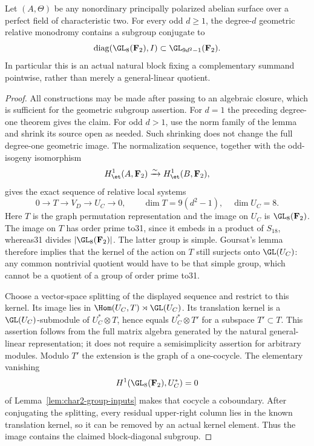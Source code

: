 \begin{theorem}
\label{thm:nonordinary-ppav-odd-natural-block-candidate}
Let $(A,\Theta)$ be any nonordinary principally polarized abelian
surface over a perfect field of characteristic two. For every odd
$d\ge1$, the degree-$d$ geometric relative monodromy contains a
subgroup conjugate to
\[
                      \operatorname{diag}(\GL_8(\mathbf F_2),I)
                  \subset\GL_{9d^2-1}(\mathbf F_2).
\]
In particular this is an actual natural block fixing a complementary
summand pointwise, rather than merely a general-linear quotient.
\end{theorem}
\begin{proof}
All constructions may be made after passing to an algebraic closure,
which is sufficient for the geometric subgroup assertion. For $d=1$
the preceding degree-one theorem gives the claim. For odd $d>1$,
use the norm family of the lemma and shrink its source open as needed.
Such shrinking does not change the full degree-one geometric image.
The normalization sequence, together with the odd-isogeny isomorphism
\[
             H^1_{\et}(A,\mathbf F_2)
                      \xrightarrow{\sim}H^1_{\et}(B,\mathbf F_2),
\]
gives the exact sequence of relative local systems
\[
 0\longrightarrow T\longrightarrow V_D\longrightarrow U_C
       \longrightarrow0,\qquad
 \dim T=9(d^2-1),\quad \dim U_C=8.
\]
Here $T$ is the graph permutation representation and the image on
$U_C$ is $\GL_8(\mathbf F_2)$. The image on $T$ has order prime to31,
since it embeds in a product of $S_{18}$, whereas31 divides
$|\GL_8(\mathbf F_2)|$. The latter group is simple.
Goursat's lemma therefore implies that the kernel of the action on
$T$ still surjects onto $\GL(U_C)$: any common nontrivial quotient
would have to be that simple group, which cannot be a quotient of
a group of order prime to31.

Choose a vector-space splitting of the displayed sequence and restrict
to this kernel. Its image lies in
$\Hom(U_C,T)\rtimes\GL(U_C)$. Its translation kernel is a
$\GL(U_C)$-submodule of $U_C^*\otimes T$, hence equals
$U_C^*\otimes T'$ for a subspace $T'\subset T$. This assertion follows
from the full matrix algebra generated by the natural general-linear
representation; it does not require a semisimplicity assertion for
arbitrary modules. Modulo $T'$ the extension is the graph of a
one-cocycle. The elementary vanishing
\[
                 H^1(\GL_8(\mathbf F_2),U_C^*)=0
\]
of Lemma~\ref{lem:char2-group-inputs} makes that cocycle a coboundary.
After conjugating the splitting, every residual upper-right column
lies in the known translation kernel, so it can be removed by an
actual kernel element. Thus the image contains the claimed
block-diagonal subgroup.


\end{proof}
